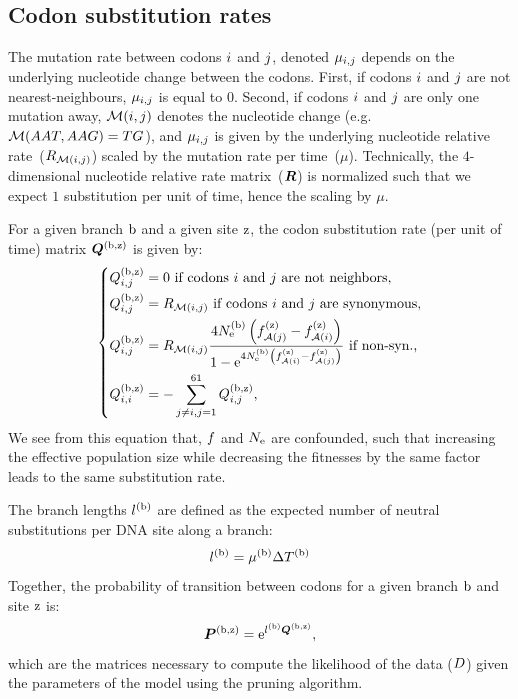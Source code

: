 \documentclass{MBE}
\begin{document}
	\subsection{Codon substitution rates}

	The mutation rate between codons ${i}$ and ${j}$, denoted $\mu_{{i}, {j}}$ depends on the underlying nucleotide change between the codons.
	First, if codons ${i}$ and ${j}$ are not nearest-neighbours, $\mu_{{i}, {j}}$ is equal to $0$.
	Second, if codons ${i}$ and ${j}$ are only one mutation away, $\mathcal{M}({i}, {j})$ denotes the nucleotide change (e.g.~$\mathcal{M}(AAT, AAG) = TG$), and $\mu_{{i}, {j}}$ is given by the underlying nucleotide relative rate~(${R_{\mathcal{M}({i}, {j})}}$) scaled by the mutation rate per time~($\mu$).
	Technically, the $4$-dimensional nucleotide relative rate matrix~($\bm{R}$) is normalized such that we expect $1$ {substitution} per unit of time, hence the scaling by $\mu$.

	For a given branch $\text{b}$ and a given site $\text{z}$, the {codon} {substitution} rate (per unit of time) matrix $\bm{Q}^{(\text{b}, \text{z})}$ is given by:
	\begin{equation}
		\label{eq:subrates}
		\begin{dcases}
			\submatrix\branchsiteexp_{\itoj} = 0\text{ if codons $\ci$ and $\cj$ are not neighbors,} \\
			\submatrix\branchsiteexp_{\itoj} = \mutmatrix_{\nucitoj}\text{ if codons $\ci$ and $\cj$ are {synonymous},} \\
			\submatrix\branchsiteexp_{\itoj} = \mutmatrix_{\nucitoj} \dfrac{4\Ne\branchexp \left({\fitj\siteexp - \fiti\siteexp}\right)}{{1 - \e^{4\Ne\branchexp\left({\fiti\siteexp - \fitj\siteexp}\right)} }} \text{ if non-syn.,}\\
			\submatrix\branchsiteexp_{\ci, \ci} = - \sum\limits_{ \cj \neq \ci, \cj=1}^{61} \submatrix\branchsiteexp_{\itoj},
		\end{dcases}
	\end{equation}
	We see from this equation that, $f$ and $N_{\text{e}}$ are confounded, such that increasing the {effective population size} while decreasing the fitnesses by the same factor leads to the same {substitution} rate.

	The branch lengths $l^{(\text{b})}$ are defined as the expected number of {neutral} substitutions per {DNA} site along a branch:
	\begin{equation}
		\label{eq:branchlength}
		\branchlength\branchexp = \mu\branchexp \branchtime\branchexp
	\end{equation}
	Together, the probability of transition between codons for a given branch $\text{b}$ and site $\text{z}$ is:
	\begin{equation}
		\label{eq:Probmatrix}
		\Probmatrix\branchsiteexp = \e^{\branchlength\branchexp \Submatrix\branchsiteexp},
	\end{equation}
	which are the matrices necessary to compute the {likelihood} of the data ($D$) given the parameters of the model using the pruning algorithm.
\end{document}
